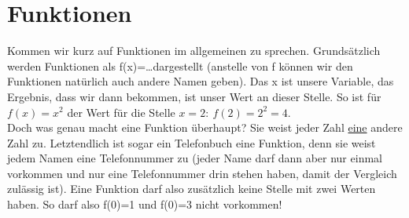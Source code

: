 \section{Funktionen}
	Kommen wir kurz auf Funktionen im allgemeinen zu sprechen. Grundsätzlich werden
	Funktionen als f(x)=\ldots dargestellt (anstelle von f können wir den
	Funktionen natürlich auch andere Namen geben). Das x ist unsere Variable, das
	Ergebnis, dass wir dann bekommen, ist unser Wert an dieser Stelle. So ist für
	\(f(x)=x^2\) der Wert für die Stelle \(x=2:\ f(2)=2^2=4\).\\
	Doch was genau macht eine Funktion überhaupt? Sie weist jeder Zahl
	\underline{eine} andere Zahl zu. Letztendlich ist sogar ein Telefonbuch eine
	Funktion, denn sie weist jedem Namen eine Telefonnummer zu (jeder Name darf
	dann aber nur einmal vorkommen und nur eine Telefonnummer drin stehen haben,
	damit der Vergleich zulässig ist). Eine Funktion darf also zusätzlich keine
	Stelle mit zwei Werten haben. So darf also f(0)=1 und f(0)=3 nicht vorkommen!

	

	

	
